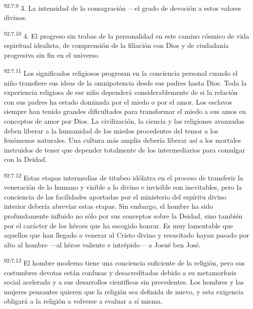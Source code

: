 \documentclass[twoside, 11pt]{book}
\begin{document}
\par
\textsuperscript{92:7.9} 3. La intensidad de la consagración ---el grado de devoción a estos valores divinos.

\par
\textsuperscript{92:7.10} 4. El progreso sin trabas de la personalidad en este camino cósmico de vida espiritual idealista, de comprensión de la filiación con Dios y de ciudadanía progresiva sin fin en el universo.

\par
\textsuperscript{92:7.11} Los significados religiosos progresan en la conciencia personal cuando el niño transfiere sus ideas de la omnipotencia desde sus padres hasta Dios. Toda la experiencia religiosa de ese niño dependerá considerablemente de si la relación con sus padres ha estado dominada por el miedo o por el amor. Los esclavos siempre han tenido grandes dificultades para transformar el miedo a sus amos en conceptos de amor por Dios. La civilización, la ciencia y las religiones avanzadas deben liberar a la humanidad de los miedos procedentes del temor a los fenómenos naturales. Una cultura más amplia debería liberar así a los mortales instruidos de tener que depender totalmente de los intermediarios para comulgar con la Deidad.

\par
\textsuperscript{92:7.12} Estas etapas intermedias de titubeo idólatra en el proceso de transferir la veneración de lo humano y visible a lo divino e invisible son inevitables, pero la conciencia de las facilidades aportadas por el ministerio del espíritu divino interior debería abreviar estas etapas. Sin embargo, el hombre ha sido profundamente influido no sólo por sus conceptos sobre la Deidad, sino también por el carácter de los héroes que ha escogido honrar. Es muy lamentable que aquellos que han llegado a venerar al Cristo divino y resucitado hayan pasado por alto al hombre ---al héroe valiente e intrépido--- a Josué ben José.

\par
\textsuperscript{92:7.13} El hombre moderno tiene una conciencia suficiente de la religión, pero sus costumbres devotas están confusas y desacreditadas debido a su metamorfosis social acelerada y a sus desarrollos científicos sin precedentes. Los hombres y las mujeres pensantes quieren que la religión sea definida de nuevo, y esta exigencia obligará a la religión a volverse a evaluar a sí misma.
\end{document}

